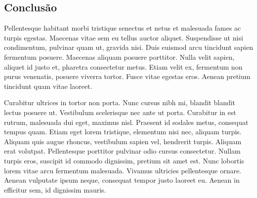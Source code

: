 \documentclass[twoside]{article}
\begin{document}
\begin{multicols}{2}
  \section{Conclusão}

  Pellentesque habitant morbi tristique senectus et netus et malesuada fames ac turpis egestas. Maecenas vitae sem eu tellus auctor aliquet. Suspendisse ut nisi condimentum, pulvinar quam ut, gravida nisi. Duis euismod arcu tincidunt sapien fermentum posuere. Maecenas aliquam posuere porttitor. Nulla velit sapien, aliquet id justo et, pharetra consectetur metus. Etiam velit ex, fermentum non purus venenatis, posuere viverra tortor. Fusce vitae egestas eros. Aenean pretium tincidunt quam vitae laoreet.

  Curabitur ultrices in tortor non porta. Nunc cursus nibh mi, blandit blandit lectus posuere ut. Vestibulum scelerisque nec ante ut porta. Curabitur in est rutrum, malesuada dui eget, maximus nisl. Praesent id sodales metus, consequat tempus quam. Etiam eget lorem tristique, elementum nisi nec, aliquam turpis. Aliquam quis augue rhoncus, vestibulum sapien vel, hendrerit turpis. Aliquam erat volutpat. Pellentesque porttitor pulvinar odio cursus consectetur. Nullam turpis eros, suscipit id commodo dignissim, pretium sit amet est. Nunc lobortis lorem vitae arcu fermentum malesuada. Vivamus ultricies pellentesque ornare. Aenean vulputate ipsum neque, consequat tempor justo laoreet eu. Aenean in efficitur sem, id dignissim mauris.





\end{multicols}
\end{document}
